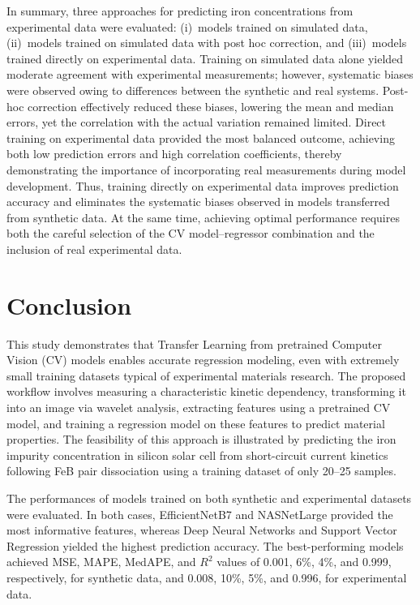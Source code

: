 \documentclass[10pt]{iopart}
\begin{document}
In summary, three approaches for predicting iron concentrations from experimental data were evaluated:
(i)~models trained on simulated data,
(ii)~models trained on simulated data with post hoc correction,
and (iii)~models trained directly on experimental data.
Training on simulated data alone yielded moderate agreement with experimental measurements;
however, systematic biases were observed owing to differences between the synthetic and real systems.
Post-hoc correction effectively reduced these biases, lowering the mean and median errors,
yet the correlation with the actual variation remained limited.
Direct training on experimental data provided the most balanced outcome,
achieving both low prediction errors and high correlation coefficients,
thereby demonstrating the importance of incorporating real measurements during model development.
Thus, training directly on experimental data improves prediction accuracy and eliminates the systematic biases observed in models transferred from synthetic data.
At the same time, achieving optimal performance requires both the careful selection of the CV model–regressor combination and the inclusion of real experimental data.


\section{Conclusion}

This study demonstrates that Transfer Learning from pretrained Computer Vision (CV) models enables accurate regression modeling,
even with extremely small training datasets typical of experimental materials research.
The proposed workflow involves measuring a characteristic kinetic dependency,
transforming it into an image via wavelet analysis,
extracting features using a pretrained CV model,
and training a regression model on these features to predict material properties.
The feasibility of this approach is illustrated by predicting the iron impurity concentration in silicon solar cell
from short-circuit current kinetics following FeB pair dissociation using a training dataset of only 20–25 samples.

The performances of models trained on both synthetic and experimental datasets were evaluated.
In both cases, EfficientNetB7 and NASNetLarge provided the most informative features,
whereas Deep Neural Networks  and  Support Vector Regression yielded the highest prediction accuracy.
The best-performing models achieved MSE, MAPE, MedAPE, and $R^2$ values of 0.001, 6\%, 4\%, and 0.999, respectively, for synthetic data,
and 0.008, 10\%, 5\%, and 0.996, for experimental data.
\end{document}
